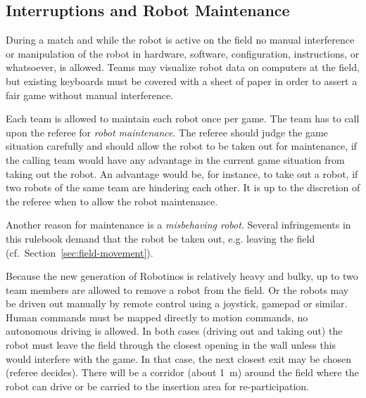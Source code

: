 \documentclass[12pt,twoside]{article}
\newcommand{\refsec}[1]{Section~\ref{#1}}
\begin{document}

\subsection{Interruptions and Robot Maintenance}
\label{sec:robot-maintenance}
During a match and while the robot is active on the field no manual
interference or manipulation of the robot in hardware, software,
configuration, instructions, or whatsoever, is allowed.  Teams may
visualize robot data on computers at the field, but existing keyboards
must be covered with a sheet of paper in order to assert a fair game
without manual interference.


Each team is allowed to maintain each robot once per game. The team
has to call upon the referee for \textit{robot maintenance}.  The
referee should judge the game situation carefully and should allow the
robot to be taken out for maintenance, if the calling team would have
any advantage in the current game situation from taking out the
robot. An advantage would be, for instance, to take out a robot, if
two robots of the same team are hindering each other. It is up to the
discretion of the referee when to allow the robot maintenance.

Another reason for maintenance is a \emph{misbehaving robot}. Several
infringements in this rulebook demand that the robot be taken out,
e.g. leaving the field (cf.~\refsec{sec:field-movement}).

Because the new generation of Robotinos is relatively heavy and bulky,
up to two team members are allowed to remove a robot from the field.
Or the robots may be driven out manually by remote control using a
joystick, gamepad or similar. Human commands must be mapped directly
to motion commands, no autonomous driving is allowed. In both cases
(driving out and taking out) the robot must leave the field through
the closest opening in the wall unless this would interfere with the
game. In that case, the next closest exit may be chosen (referee
decides). There will be a corridor (about \SI{1}{\metre}) around the
field where the robot can drive or be carried to the insertion area
for re-participation.
\end{document}
